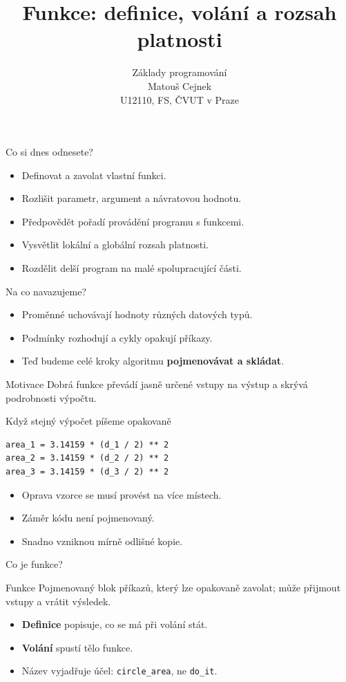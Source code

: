 \documentclass[aspectratio=169]{beamer}
\title{Funkce: definice, volání a rozsah platnosti}
\subtitle{Základy programování\\Matouš Cejnek\\U12110, FS, ČVUT v Praze}
\author{}
\institute{}
\date{}
\newcommand{\term}[1]{\textcolor{CodeBlue}{\textbf{#1}}}
\begin{document}
\begin{frame}
  \clearpage\thispagestyle{empty}\titlepage
\end{frame}

\begin{frame}{Co si dnes odnesete?}
  \begin{itemize}
    \item Definovat a zavolat vlastní funkci.
    \item Rozlišit parametr, argument a návratovou hodnotu.
    \item Předpovědět pořadí provádění programu s funkcemi.
    \item Vysvětlit lokální a globální rozsah platnosti.
    \item Rozdělit delší program na malé spolupracující části.
  \end{itemize}
\end{frame}

\begin{frame}{Na co navazujeme?}
  \begin{itemize}
    \item Proměnné uchovávají hodnoty různých datových typů.
    \item Podmínky rozhodují a cykly opakují příkazy.
    \item Teď budeme celé kroky algoritmu \term{pojmenovávat a skládat}.
  \end{itemize}
  \begin{block}{Motivace}
    Dobrá funkce převádí jasně určené vstupy na výstup a skrývá podrobnosti výpočtu.
  \end{block}
\end{frame}

\begin{frame}[fragile]{Když stejný výpočet píšeme opakovaně}
\begin{lstlisting}[style=python]
area_1 = 3.14159 * (d_1 / 2) ** 2
area_2 = 3.14159 * (d_2 / 2) ** 2
area_3 = 3.14159 * (d_3 / 2) ** 2
\end{lstlisting}
  \begin{itemize}
    \item Oprava vzorce se musí provést na více místech.
    \item Záměr kódu není pojmenovaný.
    \item Snadno vzniknou mírně odlišné kopie.
  \end{itemize}
\end{frame}

\begin{frame}{Co je funkce?}
  \begin{block}{Funkce}
    Pojmenovaný blok příkazů, který lze opakovaně zavolat; může přijmout vstupy a vrátit výsledek.
  \end{block}
  \begin{itemize}
    \item \term{Definice} popisuje, co se má při volání stát.
    \item \term{Volání} spustí tělo funkce.
    \item Název vyjadřuje účel: \texttt{circle\_area}, ne \texttt{do\_it}.
  \end{itemize}
\end{frame}
\end{document}
